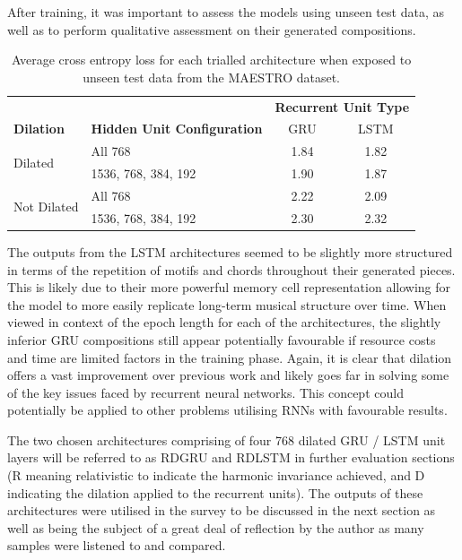 \documentclass[12pt,]{article}
\begin{document}
After training, it was important to assess the models using unseen test
data, as well as to perform qualitative assessment on their generated
compositions.

\begin{table}[H]
\centering
\caption{Average cross entropy loss for each trialled architecture when exposed to unseen test data from the MAESTRO dataset.}
\vspace{1em}
\begin{tabular}{llcc} 
\toprule
                             &                                    & \multicolumn{2}{c}{\textbf{Recurrent Unit Type}}  \\
\textbf{Dilation}            & \textbf{Hidden Unit Configuration} & GRU   & LSTM                                      \\ 
\hline
\multirow{2}{*}{Dilated}     & All 768                            & 1.84  & 1.82                                      \\ 
                             & 1536, 768, 384, 192                & 1.90  & 1.87                                     \\ 
\multirow{2}{*}{Not Dilated} & All 768                            & 2.22  & 2.09                                     \\ 
                             & 1536, 768, 384, 192                & 2.30  & 2.32                                     \\
\bottomrule
\end{tabular}
\end{table}

The outputs from the LSTM architectures seemed to be slightly more
structured in terms of the repetition of motifs and chords throughout
their generated pieces. This is likely due to their more powerful memory
cell representation allowing for the model to more easily replicate
long-term musical structure over time. When viewed in context of the
epoch length for each of the architectures, the slightly inferior GRU
compositions still appear potentially favourable if resource costs and
time are limited factors in the training phase. Again, it is clear that
dilation offers a vast improvement over previous work and likely goes
far in solving some of the key issues faced by recurrent neural
networks. This concept could potentially be applied to other problems
utilising RNNs with favourable results.

The two chosen architectures comprising of four 768 dilated GRU / LSTM
unit layers will be referred to as RDGRU and RDLSTM in further
evaluation sections (R meaning relativistic to indicate the harmonic
invariance achieved, and D indicating the dilation applied to the
recurrent units). The outputs of these architectures were utilised in
the survey to be discussed in the next section as well as being the
subject of a great deal of reflection by the author as many samples were
listened to and compared.
\end{document}
